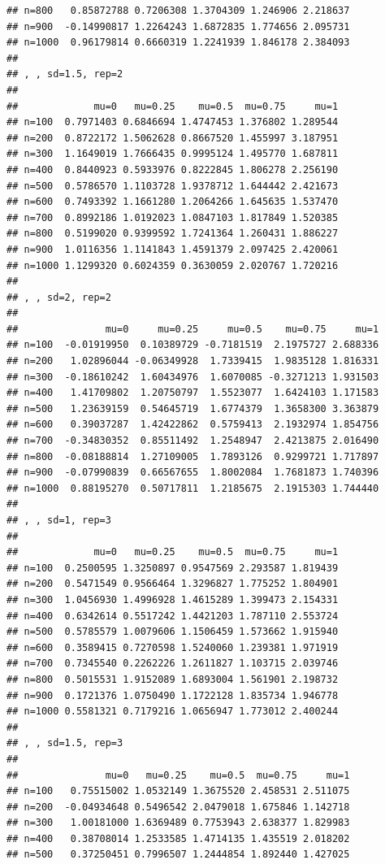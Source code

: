 \documentclass[11pt,a4paper]{article}
\begin{document}
\begin{verbatim}
## n=800   0.85872788 0.7206308 1.3704309 1.246906 2.218637
## n=900  -0.14990817 1.2264243 1.6872835 1.774656 2.095731
## n=1000  0.96179814 0.6660319 1.2241939 1.846178 2.384093
## 
## , , sd=1.5, rep=2
## 
##             mu=0   mu=0.25    mu=0.5  mu=0.75     mu=1
## n=100  0.7971403 0.6846694 1.4747453 1.376802 1.289544
## n=200  0.8722172 1.5062628 0.8667520 1.455997 3.187951
## n=300  1.1649019 1.7666435 0.9995124 1.495770 1.687811
## n=400  0.8440923 0.5933976 0.8222845 1.806278 2.256190
## n=500  0.5786570 1.1103728 1.9378712 1.644442 2.421673
## n=600  0.7493392 1.1661280 1.2064266 1.645635 1.537470
## n=700  0.8992186 1.0192023 1.0847103 1.817849 1.520385
## n=800  0.5199020 0.9399592 1.7241364 1.260431 1.886227
## n=900  1.0116356 1.1141843 1.4591379 2.097425 2.420061
## n=1000 1.1299320 0.6024359 0.3630059 2.020767 1.720216
## 
## , , sd=2, rep=2
## 
##               mu=0     mu=0.25     mu=0.5    mu=0.75     mu=1
## n=100  -0.01919950  0.10389729 -0.7181519  2.1975727 2.688336
## n=200   1.02896044 -0.06349928  1.7339415  1.9835128 1.816331
## n=300  -0.18610242  1.60434976  1.6070085 -0.3271213 1.931503
## n=400   1.41709802  1.20750797  1.5523077  1.6424103 1.171583
## n=500   1.23639159  0.54645719  1.6774379  1.3658300 3.363879
## n=600   0.39037287  1.42422862  0.5759413  2.1932974 1.854756
## n=700  -0.34830352  0.85511492  1.2548947  2.4213875 2.016490
## n=800  -0.08188814  1.27109005  1.7893126  0.9299721 1.717897
## n=900  -0.07990839  0.66567655  1.8002084  1.7681873 1.740396
## n=1000  0.88195270  0.50717811  1.2185675  2.1915303 1.744440
## 
## , , sd=1, rep=3
## 
##             mu=0   mu=0.25    mu=0.5  mu=0.75     mu=1
## n=100  0.2500595 1.3250897 0.9547569 2.293587 1.819439
## n=200  0.5471549 0.9566464 1.3296827 1.775252 1.804901
## n=300  1.0456930 1.4996928 1.4615289 1.399473 2.154331
## n=400  0.6342614 0.5517242 1.4421203 1.787110 2.553724
## n=500  0.5785579 1.0079606 1.1506459 1.573662 1.915940
## n=600  0.3589415 0.7270598 1.5240060 1.239381 1.971919
## n=700  0.7345540 0.2262226 1.2611827 1.103715 2.039746
## n=800  0.5015531 1.9152089 1.6893004 1.561901 2.198732
## n=900  0.1721376 1.0750490 1.1722128 1.835734 1.946778
## n=1000 0.5581321 0.7179216 1.0656947 1.773012 2.400244
## 
## , , sd=1.5, rep=3
## 
##               mu=0   mu=0.25    mu=0.5  mu=0.75     mu=1
## n=100   0.75515002 1.0532149 1.3675520 2.458531 2.511075
## n=200  -0.04934648 0.5496542 2.0479018 1.675846 1.142718
## n=300   1.00181000 1.6369489 0.7753943 2.638377 1.829983
## n=400   0.38708014 1.2533585 1.4714135 1.435519 2.018202
## n=500   0.37250451 0.7996507 1.2444854 1.892440 1.427025

\end{verbatim}
\end{document}
